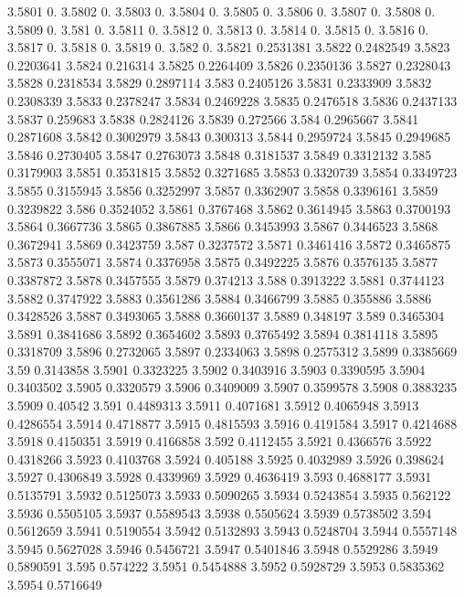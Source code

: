 3.5801  0.
3.5802  0.
3.5803  0.
3.5804  0.
3.5805  0.
3.5806  0.
3.5807  0.
3.5808  0.
3.5809  0.
3.581  0.
3.5811  0.
3.5812  0.
3.5813  0.
3.5814  0.
3.5815  0.
3.5816  0.
3.5817  0.
3.5818  0.
3.5819  0.
3.582  0.
3.5821  0.2531381
3.5822  0.2482549
3.5823  0.2203641
3.5824  0.216314
3.5825  0.2264409
3.5826  0.2350136
3.5827  0.2328043
3.5828  0.2318534
3.5829  0.2897114
3.583  0.2405126
3.5831  0.2333909
3.5832  0.2308339
3.5833  0.2378247
3.5834  0.2469228
3.5835  0.2476518
3.5836  0.2437133
3.5837  0.259683
3.5838  0.2824126
3.5839  0.272566
3.584  0.2965667
3.5841  0.2871608
3.5842  0.3002979
3.5843  0.300313
3.5844  0.2959724
3.5845  0.2949685
3.5846  0.2730405
3.5847  0.2763073
3.5848  0.3181537
3.5849  0.3312132
3.585  0.3179903
3.5851  0.3531815
3.5852  0.3271685
3.5853  0.3320739
3.5854  0.3349723
3.5855  0.3155945
3.5856  0.3252997
3.5857  0.3362907
3.5858  0.3396161
3.5859  0.3239822
3.586  0.3524052
3.5861  0.3767468
3.5862  0.3614945
3.5863  0.3700193
3.5864  0.3667736
3.5865  0.3867885
3.5866  0.3453993
3.5867  0.3446523
3.5868  0.3672941
3.5869  0.3423759
3.587  0.3237572
3.5871  0.3461416
3.5872  0.3465875
3.5873  0.3555071
3.5874  0.3376958
3.5875  0.3492225
3.5876  0.3576135
3.5877  0.3387872
3.5878  0.3457555
3.5879  0.374213
3.588  0.3913222
3.5881  0.3744123
3.5882  0.3747922
3.5883  0.3561286
3.5884  0.3466799
3.5885  0.355886
3.5886  0.3428526
3.5887  0.3493065
3.5888  0.3660137
3.5889  0.348197
3.589  0.3465304
3.5891  0.3841686
3.5892  0.3654602
3.5893  0.3765492
3.5894  0.3814118
3.5895  0.3318709
3.5896  0.2732065
3.5897  0.2334063
3.5898  0.2575312
3.5899  0.3385669
3.59  0.3143858
3.5901  0.3323225
3.5902  0.3403916
3.5903  0.3390595
3.5904  0.3403502
3.5905  0.3320579
3.5906  0.3409009
3.5907  0.3599578
3.5908  0.3883235
3.5909  0.40542
3.591  0.4489313
3.5911  0.4071681
3.5912  0.4065948
3.5913  0.4286554
3.5914  0.4718877
3.5915  0.4815593
3.5916  0.4191584
3.5917  0.4214688
3.5918  0.4150351
3.5919  0.4166858
3.592  0.4112455
3.5921  0.4366576
3.5922  0.4318266
3.5923  0.4103768
3.5924  0.405188
3.5925  0.4032989
3.5926  0.398624
3.5927  0.4306849
3.5928  0.4339969
3.5929  0.4636419
3.593  0.4688177
3.5931  0.5135791
3.5932  0.5125073
3.5933  0.5090265
3.5934  0.5243854
3.5935  0.562122
3.5936  0.5505105
3.5937  0.5589543
3.5938  0.5505624
3.5939  0.5738502
3.594  0.5612659
3.5941  0.5190554
3.5942  0.5132893
3.5943  0.5248704
3.5944  0.5557148
3.5945  0.5627028
3.5946  0.5456721
3.5947  0.5401846
3.5948  0.5529286
3.5949  0.5890591
3.595  0.574222
3.5951  0.5454888
3.5952  0.5928729
3.5953  0.5835362
3.5954  0.5716649
